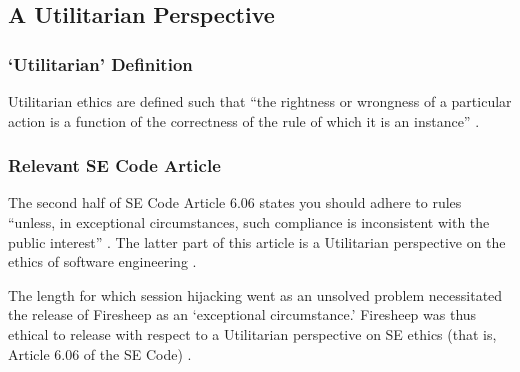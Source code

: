 \documentclass[12pt,twocolumn]{article}
\begin{document}
\subsection{A Utilitarian Perspective}
\subsubsection{`Utilitarian' Definition}
Utilitarian ethics are defined such that ``the rightness or wrongness of a particular action is a function of the correctness of the rule of which it is an instance'' \cite{rule-utilitarianism}.

\subsubsection{Relevant SE Code Article}
The second half of SE Code Article 6.06 states you should adhere to rules ``unless, in exceptional circumstances, such compliance is inconsistent with the public interest'' \cite{se-code}. The latter part of this article is a Utilitarian perspective on the ethics of software engineering \cite{rule-utilitarianism}. 

The length for which session hijacking went as an unsolved problem necessitated the release of Firesheep as an `exceptional circumstance.' Firesheep was thus ethical to release with respect to a Utilitarian perspective on SE ethics (that is, Article 6.06 of the SE Code) \cite{se-code}.

\nocite{*}



\onecolumn

\end{document}

